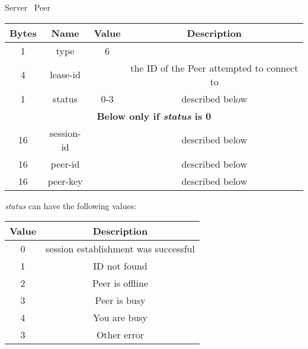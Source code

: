 \documentclass{article}
\begin{document}
    \begin{center}
        Server \textrightarrow\ Peer\\
        \begin{tabular}{|c|c|c|c|}
            \hline
            \textbf{Bytes} & \textbf{Name} & \textbf{Value} & \textbf{Description}                       \\
            \hline
            1              & type          & 6              &                                            \\
            \hline
            4              & lease-id      &                & the ID of the Peer attempted to connect to \\
            \hline
            1              & status        & 0-3            & described below                            \\
            \hline
            \multicolumn{4}{|c|}{\textbf{Below only if \emph{status} is 0} } \\
            \hline
            16             & session-id    &                & described below                            \\
            \hline
            16             & peer-id       &                & described below                            \\
            \hline
            16             & peer-key      &                & described below                            \\
            \hline
        \end{tabular}
    \end{center}

    \emph{status} can have the following values:

    \begin{center}
        \begin{tabular}{|c|c|}
            \hline
            \textbf{Value} & \textbf{Description}                 \\
            \hline
            0              & session establishment was successful \\
            \hline
            1              & ID not found                         \\
            \hline
            2              & Peer is offline                      \\
            \hline
            3              & Peer is busy                         \\
            \hline
            4              & You are busy                         \\
            \hline
            3              & Other error                          \\
            \hline
        \end{tabular}
    \end{center}
\end{document}
